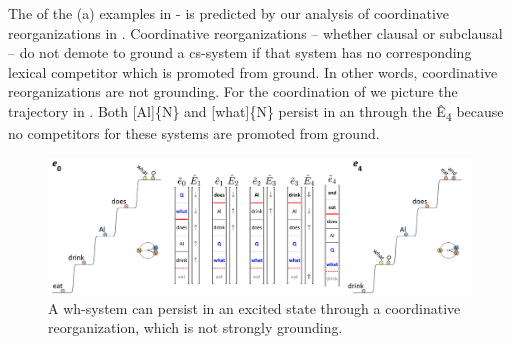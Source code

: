 \label{ex:7:22}
    \label{ex:7:22a}
    \label{ex:7:22b}
    \label{ex:7:22c}
\z
\z

\label{ex:7:23}
    \label{ex:7:23a}
    \label{ex:7:23b}
    \label{ex:7:23c}
\z
\z

\label{ex:7:24}
    \label{ex:7:24a}
    \label{ex:7:24b}
    \label{ex:7:24c}
\z
\z

The  of the (a) examples in - is predicted by our analysis of coordinative reorganizations in . Coordinative reorganizations -- whether clausal or subclausal -- do not demote to ground a cs-system if that system has no corresponding lexical competitor which is promoted from ground. In other words, coordinative reorganizations are not grounding. For the  coordination of  we picture the trajectory in {}. Both [Al]\{N\} and [what]\{N\} persist in an  through the  Ê\textsubscript{4} because no competitors for these systems are promoted from ground.

  
\begin{figure}
\includegraphics[width=\textwidth]{figures/Tilsen-img165.png}
\caption{A wh-system can persist in an excited state through a coordinative reorganization, which is not strongly grounding.}
\label{fig:7:21}
\end{figure}
 

